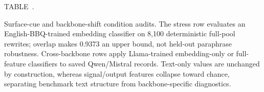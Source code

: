 \documentclass{ieeeaccess}
\newcommand{\inlinetablecaption}[2]{%
  \par\vspace{0.62\baselineskip}\noindent
  \refstepcounter{table}\label{#1}%
  {\color{accessblue}\tablecapheadfont TABLE~\thetable.\ }%
  {\tablecapfont #2\par}%
  \vspace{6pt}%
}
\begin{document}
\noindent\begin{minipage}{\columnwidth}
\inlinetablecaption{tab:followup_stress}{Surface-cue and backbone-shift condition audits. The stress row evaluates an English-BBQ-trained embedding classifier on 8,100 deterministic full-pool rewrites; overlap makes 0.9373 an upper bound, not held-out paraphrase robustness. Cross-backbone rows apply Llama-trained embedding-only or full-feature classifiers to saved Qwen/Mistral records. Text-only values are unchanged by construction, whereas signal/output features collapse toward chance, separating benchmark text structure from backbone-specific diagnostics.}
\begin{center}
\scriptsize
\setlength{\tabcolsep}{1.5pt}
\renewcommand{\arraystretch}{1.05}
\end{center}
\end{minipage}
\par\vspace{0.5\baselineskip}
\end{document}
